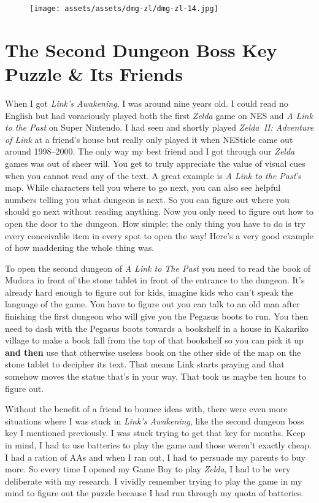 \documentclass{book}
\begin{document}
\begin{figure}[hbt]
\vskip 10pt
\centering \texttt{[image: assets/assets/dmg-zl/dmg-zl-14.jpg]}
\vskip 6pt
\end{figure}

\FloatBarrier\needspace{5pt}\section*{The Second Dungeon Boss Key Puzzle \& Its Friends}\nopagebreak[4]

When I got \emph{Link’s Awakening}, I was around nine years old. I could read no English but had voraciously played both the first \emph{Zelda} game on NES and \emph{A Link to the Past} on Super Nintendo. I had seen and shortly played \emph{Zelda II: Adventure of Link} at a friend’s house but really only played it when NESticle came out around 1998–2000. The only way my best friend and I got through our \emph{Zelda} games was out of sheer will. You get to truly appreciate the value of visual cues when you cannot read any of the text. A great example is \emph{A Link to the Past}’s map. While characters tell you where to go next, you can also see helpful numbers telling you what dungeon is next. So you can figure out where you should go next without reading anything. Now you only need to figure out how to open the door to the dungeon. How simple: the only thing you have to do is try every conceivable item in every spot to open the way! Here’s a very good example of how maddening the whole thing was.

To open the second dungeon of \emph{A Link to The Past} you need to read the book of Mudora in front of the stone tablet in front of the entrance to the dungeon. It’s already hard enough to figure out for kids, imagine kids who can’t speak the language of the game. You have to figure out you can talk to an old man after finishing the first dungeon who will give you the Pegasus boots to run. You then need to dash with the Pegasus boots towards a bookshelf in a house in Kakariko village to make a book fall from the top of that bookshelf so you can pick it up \textbf{and then} use that otherwise useless book on the other side of the map on the stone tablet to decipher its text. That means Link starts praying and that somehow moves the statue that’s in your way. That took us maybe ten hours to figure out.

Without the benefit of a friend to bounce ideas with, there were even more situations where I was stuck in \emph{Link’s Awakening}, like the second dungeon boss key I mentioned previously. I was stuck trying to get that key for months. Keep in mind, I had to use batteries to play the game and those weren’t exactly cheap. I had a ration of AAs and when I ran out, I had to persuade my parents to buy more. So every time I opened my Game Boy to play \emph{Zelda}, I had to be very deliberate with my research. I vividly remember trying to play the game in my mind to figure out the puzzle because I had run through my quota of batteries.
\end{document}
